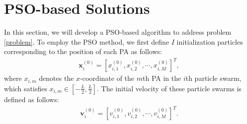 \documentclass[summary]{ursi}
\begin{document}
\section{PSO-based Solutions}

In this section, we will develop a PSO-based algorithm to address problem \eqref{problem}. To employ the PSO method, we first define $I$ initialization particles corresponding to the position of each PA as follows:
\begin{align}
	\mathbf{x}_i^{(0)}=[x^{(0)}_{i,1},x^{(0)}_{i,2},\cdots,x^{(0)}_{i,M}]^T,
\end{align}
where $x_{i,m}$ denotes the $x$-coordinate of the $m$th PA in the $i$th particle swarm, which satisfies $x_{i,m} \in [-\frac{L}{2},\frac{L}{2}]$.  The initial velocity of these particle swarms is defined as follows:
\begin{align}
	\mathbf{v}_i^{(0)}=[v^{(0)}_{i,1},v^{(0)}_{i,2},\cdots,v^{(0)}_{i,M}]^T.
\end{align}
\end{document}
